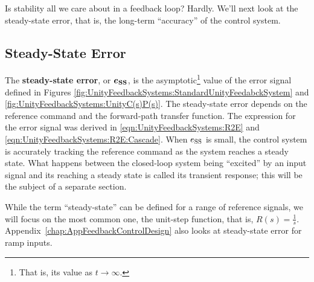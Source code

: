 Is stability all we care about in a feedback loop? Hardly. We'll next look at the steady-state error, that is, the long-term ``accuracy'' of the control system. 

\subsection{Steady-State Error}
\label{sec:SSError:SystemType}

The \textbf{steady-state error}, or $\bm{e_{\rm SS}}$, is the asymptotic\footnote{That is, its value as $t \to \infty$.} value of the error signal defined in Figures \ref{fig:UnityFeedbackSystems:StandardUnityFeedabckSystem} and \ref{fig:UnityFeedbackSystems:UnityC(s)P(s)}. The steady-state error depends on the reference command and the forward-path transfer function. The expression for the error signal was derived in \eqref{eqn:UnityFeedbackSystems:R2E} and \eqref{eqn:UnityFeedbackSystems:R2E:Cascade}. When $e_{\rm SS}$ is small, the control system is accurately tracking the reference command as the system reaches a steady state. What happens between the closed-loop system being ``excited'' by an input signal and its reaching a steady state is called its transient response; this will be the subject of a separate section.

While the term ``steady-state'' can be defined for a range of reference signals, we will focus on the most common one, the unit-step function, that is, $R(s) = \frac{1}{s}$. Appendix~\ref{chap:AppFeedbackControlDesign} also looks at steady-state error for ramp inputs.\\

